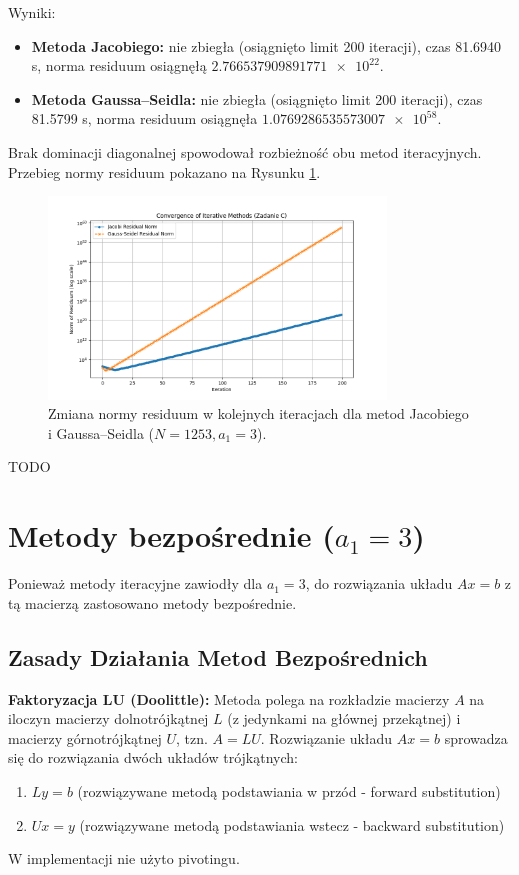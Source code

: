 \documentclass[a4paper, 11pt]{article}
\begin{document}
Wyniki:
\begin{itemize}
    \item \textbf{Metoda Jacobiego:} nie zbiegła (osiągnięto limit 200 iteracji), czas \num{81.6940} s, norma residuum osiągnęłą $\num{2.766537909891771e+22}$.
    \item \textbf{Metoda Gaussa–Seidla:} nie zbiegła (osiągnięto limit 200 iteracji), czas \num{81.5799} s, norma residuum osiągnęła $\num{1.0769286535573007e+58}$.
\end{itemize}
Brak dominacji diagonalnej spowodował rozbieżność obu metod iteracyjnych. Przebieg normy residuum pokazano na Rysunku \ref{fig:task_c_convergence}.

\begin{figure}[H]
    \centering
    \includegraphics[width=0.8\textwidth]{residuals_plot_C}
    \caption{Zmiana normy residuum w kolejnych iteracjach dla metod Jacobiego i Gaussa–Seidla ($N=1253, a_1=3$).}
    \label{fig:task_c_convergence}
\end{figure}

TODO

\section{Metody bezpośrednie ($a_1 = 3$)}
Ponieważ metody iteracyjne zawiodły dla $a_1=3$, do rozwiązania układu $Ax=b$ z tą macierzą zastosowano metody bezpośrednie.

\subsection{Zasady Działania Metod Bezpośrednich}

\textbf{Faktoryzacja LU (Doolittle):} Metoda polega na rozkładzie macierzy $A$ na iloczyn macierzy dolnotrójkątnej $L$ (z jedynkami na głównej przekątnej) i macierzy górnotrójkątnej $U$, tzn. $A = LU$. Rozwiązanie układu $Ax=b$ sprowadza się do rozwiązania dwóch układów trójkątnych:
\begin{enumerate}
    \item $Ly = b$ (rozwiązywane metodą podstawiania w przód - forward substitution)
    \item $Ux = y$ (rozwiązywane metodą podstawiania wstecz - backward substitution)
\end{enumerate}
W implementacji nie użyto pivotingu.
\end{document}
